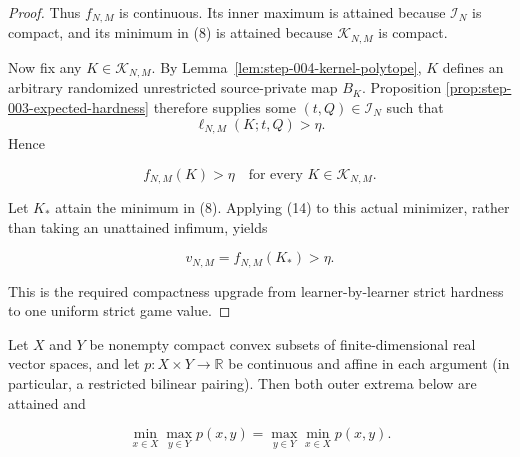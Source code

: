 \begin{proof}
Thus \(f_{N,M}\) is continuous. Its inner maximum is attained because
\(\mathcal I_N\) is compact, and its minimum in (8) is attained because
\(\mathcal K_{N,M}\) is compact.

Now fix any \(K\in\mathcal K_{N,M}\). By
Lemma~\ref{lem:step-004-kernel-polytope}, \(K\) defines an arbitrary
randomized unrestricted source-private map \(B_K\).  Proposition
\ref{prop:step-003-expected-hardness} therefore supplies some
\((t,Q)\in\mathcal I_N\) such that
\[
\ell_{N,M}(K;t,Q)>\eta.
\]
Hence

\[
f_{N,M}(K)>\eta
\quad\text{for every }K\in\mathcal K_{N,M}.
\tag{14}
\]

Let \(K_*\) attain the minimum in (8). Applying (14) to this actual
minimizer, rather than taking an unattained infimum, yields

\[
v_{N,M}=f_{N,M}(K_*)>\eta.
\tag{15}
\]

This is the required compactness upgrade from learner-by-learner strict
hardness to one uniform strict game value. \end{proof}

\begin{lemma}\label{lem:step-004-compact-minimax}
Let \(X\) and \(Y\) be nonempty compact convex subsets of finite-dimensional
real vector spaces, and let \(p:X\times Y\to\mathbb R\) be continuous and
affine in each argument (in particular, a restricted bilinear pairing).
Then both outer extrema below are attained and

\[
\min_{x\in X}\max_{y\in Y}p(x,y)
=
\max_{y\in Y}\min_{x\in X}p(x,y).
\tag{16}
\]
\end{lemma}

